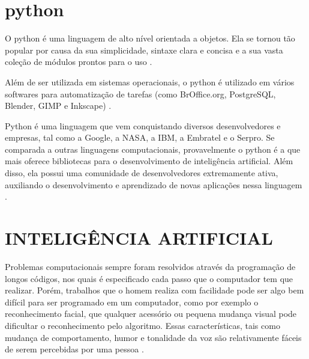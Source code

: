 \section{python}
\label{sec:python}

O python é uma linguagem de alto nível orientada a objetos. Ela se tornou tão popular por causa da sua simplicidade, sintaxe clara e concisa e a sua vasta coleção de módulos prontos para o uso \cite{borges2014python}. 

Além de ser utilizada em sistemas operacionais, o python é utilizado em vários softwares para automatização de tarefas (como BrOffice.org, PostgreSQL, Blender, GIMP e Inkscape) \cite{borges2014python}. 

Python é uma linguagem que vem conquistando diversos desenvolvedores e empresas, tal como a Google, a NASA, a IBM, a Embratel e o Serpro. Se comparada a outras linguagens computacionais, provavelmente o python é a que mais oferece bibliotecas para o desenvolvimento de inteligência artificial. Além disso, ela possui uma comunidade de desenvolvedores extremamente ativa, auxiliando o desenvolvimento e aprendizado de novas aplicações nessa linguagem \cite{jonasgranatyr}. 

\section{INTELIGÊNCIA ARTIFICIAL }
\label{sec:INTELIGÊNCIA ARTIFICIAL }

Problemas computacionais sempre foram resolvidos através da programação de
longos códigos, nos quais é especificado cada passo que o computador tem que realizar. Porém, trabalhos que o homem realiza com facilidade pode ser algo bem difícil para ser programado em um computador, como por exemplo o reconhecimento facial, que qualquer acessório ou pequena mudança visual pode dificultar o reconhecimento pelo algoritmo. Essas características, tais como mudança de comportamento, humor e tonalidade da voz são relativamente fáceis de serem percebidas por uma pessoa \cite{lorenafaceli2011inteligencia}. 

 
